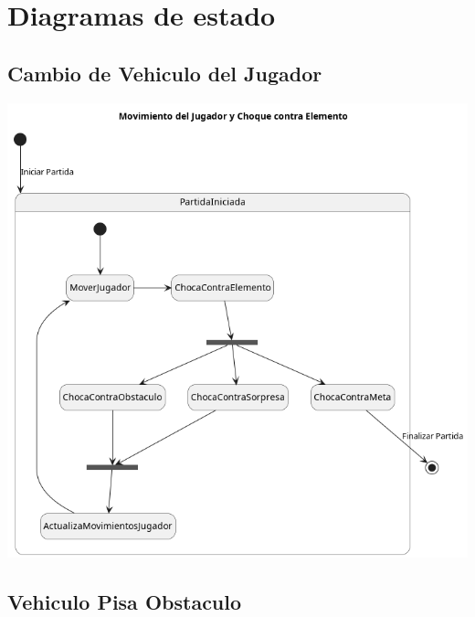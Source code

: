 \documentclass[titlepage,a4paper]{article}
\begin{document}
\section{Diagramas de estado}
\label{sec:orgfe2dafd}
\subsection{Cambio de Vehiculo del Jugador}
\label{sec:org956e02b}

\begin{center}
\includegraphics[width=.9\linewidth]{./diagramas/estado-cambio-vehiculo.png}
\end{center}

\subsection{Vehiculo Pisa Obstaculo}
\label{sec:orgc8d3cc8}
\end{document}
